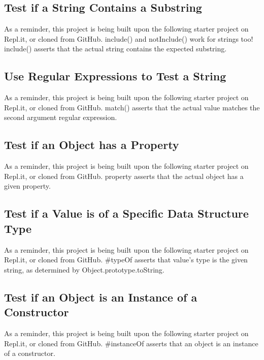 \documentclass{article}%
\begin{document}
%
\subsection{Test if a String Contains a Substring}%
\label{subsec:TestifaStringContainsaSubstring}%
As a reminder, this project is being built upon the following starter project on Repl.it, or cloned from GitHub.\newline%
include() and notInclude() work for strings too!\newline%
include() asserts that the actual string contains the expected substring.\newline%

%
\subsection{Use Regular Expressions to Test a String}%
\label{subsec:UseRegularExpressionstoTestaString}%
As a reminder, this project is being built upon the following starter project on Repl.it, or cloned from GitHub.\newline%
match() asserts that the actual value matches the second argument regular expression.\newline%

%
\subsection{Test if an Object has a Property}%
\label{subsec:TestifanObjecthasaProperty}%
As a reminder, this project is being built upon the following starter project on Repl.it, or cloned from GitHub.\newline%
property asserts that the actual object has a given property.\newline%

%
\subsection{Test if a Value is of a Specific Data Structure Type}%
\label{subsec:TestifaValueisofaSpecificDataStructureType}%
As a reminder, this project is being built upon the following starter project on Repl.it, or cloned from GitHub.\newline%
\#typeOf asserts that value’s type is the given string, as determined by Object.prototype.toString.\newline%

%
\subsection{Test if an Object is an Instance of a Constructor}%
\label{subsec:TestifanObjectisanInstanceofaConstructor}%
As a reminder, this project is being built upon the following starter project on Repl.it, or cloned from GitHub.\newline%
\#instanceOf asserts that an object is an instance of a constructor.\newline%
\end{document}
